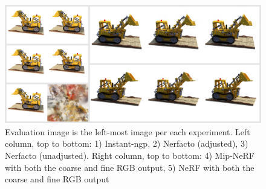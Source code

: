 \begin{figure}[h]
    \centering
    \includegraphics[width=1.0\textwidth]{figures/lego-result.png}
    \caption{Evaluation image is the left-most image per each experiment.
    Left column, top to bottom: 1) Instant-ngp, 2) Nerfacto (adjusted), 3) Nerfacto (unadjusted). Right column, top to bottom: 4) Mip-NeRF with both the coarse and fine RGB output, 5) NeRF with both the coarse and fine RGB output}
    \label{fig:lego-result}
\end{figure}